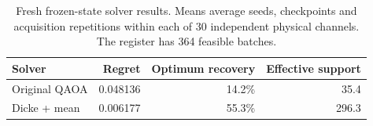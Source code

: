 \begin{table}[htbp]
\centering
\begin{tabular}{lrrr}
\toprule
Solver & Regret & Optimum recovery & Effective support \\
\midrule
Original QAOA & 0.048136 & 14.2\% & 35.4 \\
Dicke + mean & 0.006177 & 55.3\% & 296.3 \\
\bottomrule
\end{tabular}
\caption{Fresh frozen-state solver results. Means average seeds, checkpoints and acquisition repetitions within each of 30 independent physical channels. The register has 364 feasible batches.}
\label{tab:fresh-solver}
\end{table}

